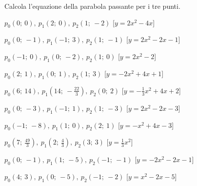 \begin{esercizio}\label{ese:}
 Calcola l'equazione della parabola passante per i tre punti.
 \begin{enumeratea}
  \item  \(p_0 \left (0;~0 \right ),~p_1 \left (2;~0 \right ),~p_2 \left (1;~-2 \right )\)
   \hfill [\(y=2 x^2 -4 x \)]
  \item  \(p_0 \left (0;~-1 \right ),~p_1 \left (-1;~3 \right ),~p_2 \left (1;~-1 \right )\)
   \hfill [\(y=2 x^2 -2 x -1\)]
  \item  \(p_0 \left (-1;~0 \right ),~p_1 \left (0;~-2 \right ),~p_2 \left (1;~0 \right )\)
   \hfill [\(y=2 x^2 -2\)]
  \item  \(p_0 \left (2;~1 \right ),~p_1 \left (0;~1 \right ),~p_2 \left (1;~3 \right )\)
   \hfill [\(y=-2 x^2 +4 x +1\)]
  \item  \(p_0 \left (6;~14 \right ),~p_1 \left (14;~-\frac{22}{3} \right ),~p_2 \left (0;~2 \right )\)
   \hfill [\(y=-\frac{1}{3} x^2 +4 x +2\)]
  \item  \(p_0 \left (0;~-3 \right ),~p_1 \left (-1;~1 \right ),~p_2 \left (1;~-3 \right )\)
   \hfill [\(y=2 x^2 -2 x -3\)]
  \item  \(p_0 \left (-1;~-8 \right ),~p_1 \left (1;~0 \right ),~p_2 \left (2;~1 \right )\)
   \hfill [\(y=- x^2 +4 x -3\)]
  \item  \(p_0 \left (7;~\frac{49}{3} \right ),~p_1 \left (2;~\frac{4}{3} \right ),~p_2 \left (3;~3 \right )\)
   \hfill [\(y=\frac{1}{3} x^2 \)]
  \item  \(p_0 \left (0;~-1 \right ),~p_1 \left (1;~-5 \right ),~p_2 \left (-1;~-1 \right )\)
   \hfill [\(y=-2 x^2 -2 x -1\)]
  \item  \(p_0 \left (4;~3 \right ),~p_1 \left (0;~-5 \right ),~p_2 \left (-1;~-2 \right )\)
   \hfill [\(y=x^2 -2 x -5\)]

\end{enumeratea}
\end{esercizio}
